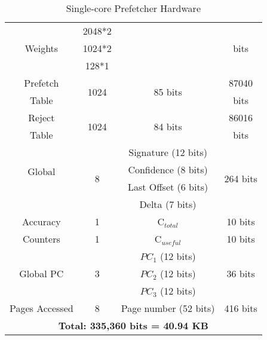 \begin{table}[h]
\begin{adjustwidth}{}{}
\begin{adjustbox}{width=0.8\columnwidth}
\begin{tabular}{|c|c|c|c|}
        \multirow{3}{1.2cm}{Weights}                & 2048*2    &           &  \multirow{3}{0.5cm}{bits}  \\
                                                    & 1024*2    &           &               \\
                                                    & 128*1     &           &              \\
    \hline
        Prefetch                & \multirow{2}{0.7cm}{1024}      & \multirow{2}{1cm}{85 bits}       & 87040 \\
        Table\footnotemark[1]   &           &               & bits\\
    \hline
        Reject                & \multirow{2}{0.7cm}{1024}      & \multirow{2}{1cm}{84 bits}    & 86016 \\
        Table\footnotemark[2] & & & bits\\
    \hline
        \multirow{4}{1.0cm}{Global\newline\newline}   & \multirow{4}{0.2cm}{8} & Signature (12 bits)  & \multirow{4}{1.1cm}{264 bits} \\
        \multirow{3}{1.1cm}{History\newline}        &                        & Confidence (8 bits)  &                               \\
        \multirow{2}{1.2cm}{Register}               &                        & Last Offset (6 bits) &                               \\
                                                    &                        & Delta (7 bits)       &                               \\
    \hline
        Accuracy        & 1     & C$_{total}$       & 10 bits   \\
        Counters        & 1     & C$_{useful}$      & 10 bits   \\
    \hline
        \multirow{3}{1.5cm}{Global PC\newline}      &       & $PC_1$ (12 bits)      &           \\
        \multirow{2}{1.5cm}{~Trackers}              & 3     & $PC_2$ (12 bits)      & 36 bits   \\
                                                    &       & $PC_3$ (12 bits)      &           \\
    \hline
	Pages Accessed			&	8			   & 	Page number (52 bits) 	& 416 bits	\\
    \hline
        \multicolumn{4}{|c|}{\textbf{Total: 335,360 bits = 40.94 KB}}\\
    \hline
    \end{tabular}
    \end{adjustbox}
    \caption{Single-core Prefetcher Hardware}
    \label{tab:PPF_overhead}
\end{adjustwidth}
\end{table}


